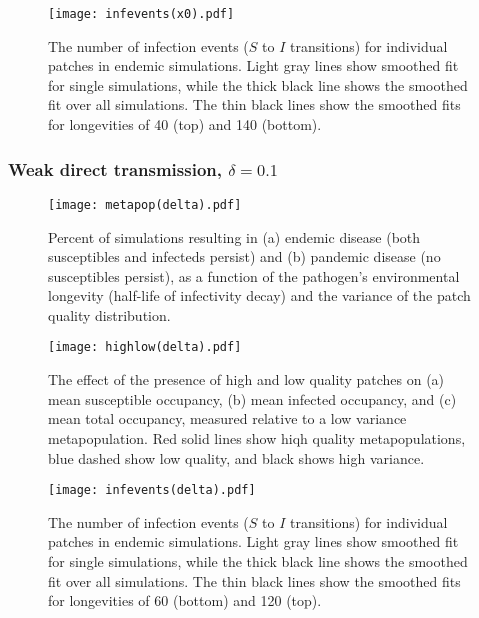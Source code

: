 \documentclass{svjour3}
\begin{document}
\begin{figure}
\centering
\texttt{[image: infevents(x0).pdf]}
\caption{The number of infection events ($S$ to $I$ transitions) for individual patches in endemic simulations.  Light gray lines show smoothed fit for single simulations, while the thick black line shows the smoothed fit over all simulations.  The thin black lines show the smoothed fits for longevities of 40 (top) and 140 (bottom).}
\label{infections_x0}
\end{figure}

\clearpage

\subsubsection{Weak direct transmission, $\delta = 0.1$}

\begin{figure}[h!]
\centering
\texttt{[image: metapop(delta).pdf]}
\caption{Percent of simulations resulting in (a) endemic disease (both susceptibles and infecteds persist) and (b) pandemic disease (no susceptibles persist), as a function of the pathogen's environmental longevity (half-life of infectivity decay) and the variance of the patch quality distribution.}
\label{poutcome_delta}
\end{figure}   

\begin{figure}
\centering
\texttt{[image: highlow(delta).pdf]}
\caption{The effect of the presence of high and low quality patches on (a) mean susceptible occupancy, (b) mean infected occupancy, and (c) mean total occupancy, measured relative to  a low variance metapopulation.  Red solid lines show hiqh quality metapopulations, blue dashed show low quality, and black shows high variance.}
\label{sens_delta}
\end{figure}

\begin{figure}
\centering
\texttt{[image: infevents(delta).pdf]}
\caption{The number of infection events ($S$ to $I$ transitions) for individual patches in endemic simulations.  Light gray lines show smoothed fit for single simulations, while the thick black line shows the smoothed fit over all simulations.  The thin black lines show the smoothed fits for longevities of 60 (bottom) and 120 (top).}
\label{infections_delta}
\end{figure}

\clearpage

     
\end{document}

